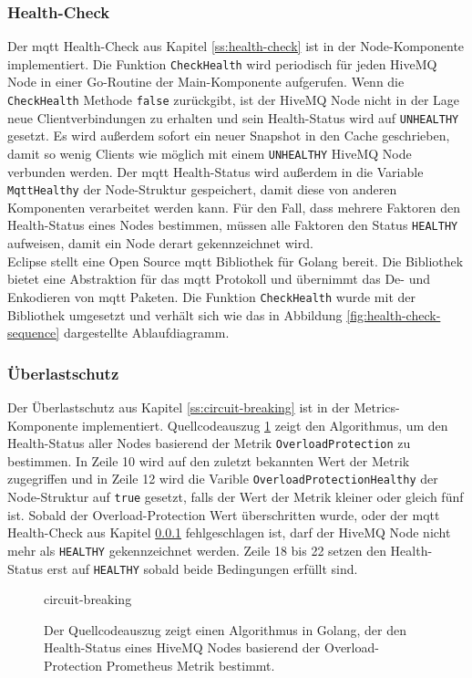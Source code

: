 \newpage
\subsubsection{Health-Check} \label{si:health-check}
Der \ac{mqtt} Health-Check aus Kapitel \ref{ss:health-check} ist in der Node-Komponente implementiert. Die Funktion \verb|CheckHealth| wird periodisch für jeden HiveMQ Node in einer Go-Routine der Main-Komponente aufgerufen. Wenn die \verb|CheckHealth| Methode \verb|false| zurückgibt, ist der HiveMQ Node nicht in der Lage neue Clientverbindungen zu erhalten und sein Health-Status wird auf \verb|UNHEALTHY| gesetzt. Es wird au{\ss}erdem sofort ein neuer Snapshot in den Cache geschrieben, damit so wenig Clients wie möglich mit einem \verb|UNHEALTHY| HiveMQ Node verbunden werden. Der \ac{mqtt} Health-Status wird au{\ss}erdem in die Variable \verb|MqttHealthy| der Node-Struktur gespeichert, damit diese von anderen Komponenten verarbeitet werden kann. Für den Fall, dass mehrere Faktoren den Health-Status eines Nodes bestimmen, müssen alle Faktoren den Status \verb|HEALTHY| aufweisen, damit ein Node derart gekennzeichnet wird.
\\
Eclipse stellt eine Open Source \ac{mqtt} Bibliothek für Golang bereit.
\cite{EclipsePahoMqtt2021}
Die Bibliothek bietet eine Abstraktion für das \ac{mqtt} Protokoll und übernimmt das De- und Enkodieren von \ac{mqtt} Paketen. Die Funktion \verb|CheckHealth| wurde mit der Bibliothek umgesetzt und verhält sich wie das in Abbildung \ref{fig:health-check-sequence} dargestellte Ablaufdiagramm.

\subsubsection{Überlastschutz}
Der Überlastschutz aus Kapitel \ref{ss:circuit-breaking} ist in der Metrics-Komponente implementiert. Quellcodeauszug \ref{code:circuit-breaking} zeigt den Algorithmus, um den Health-Status aller Nodes basierend der Metrik \verb|OverloadProtection| zu bestimmen. In Zeile 10 wird auf den zuletzt bekannten Wert der Metrik zugegriffen und in Zeile 12 wird die Varible \verb|OverloadProtectionHealthy| der Node-Struktur auf \verb|true| gesetzt, falls der Wert der Metrik kleiner oder gleich fünf ist.
Sobald der Overload-Protection Wert überschritten wurde, oder der \ac{mqtt} Health-Check aus Kapitel \ref{si:health-check} fehlgeschlagen ist, darf der HiveMQ Node nicht mehr als \verb|HEALTHY| gekennzeichnet werden. Zeile 18 bis 22 setzen den Health-Status erst auf \verb|HEALTHY| sobald beide Bedingungen erfüllt sind.
\begin{figure}
    {circuit-breaking}
    \caption{Der Quellcodeauszug zeigt einen Algorithmus in Golang, der den Health-Status eines HiveMQ Nodes basierend der Overload-Protection Prometheus Metrik bestimmt.}
    \label{code:circuit-breaking}
\end{figure}
\newpage

